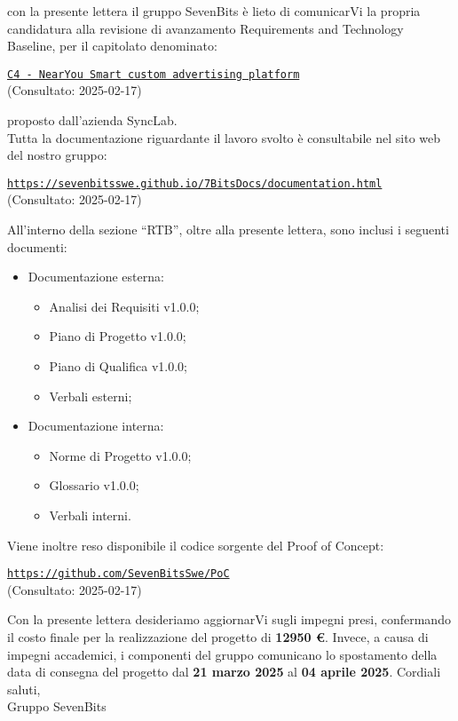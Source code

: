 \documentclass[10pt]{article}
\begin{document}
con la presente lettera il gruppo SevenBits è lieto di comunicarVi la propria candidatura alla revisione di avanzamento Requirements and Technology Baseline, per il capitolato denominato:
\begin{center}
\textcolor{blue}{\texttt{\href{https://www.math.unipd.it/~tullio/IS-1/2024/Progetto/C4.pdf}{C4 - NearYou Smart custom advertising platform}}}\\ (Consultato: 2025-02-17)
\end{center}
proposto dall'azienda SyncLab.\\
Tutta la documentazione riguardante il lavoro svolto è consultabile nel sito web del nostro gruppo:
\begin{center}
\textcolor{blue}{\texttt{\url{https://sevenbitsswe.github.io/7BitsDocs/documentation.html}}}\\ (Consultato: 2025-02-17)
\end{center}
All'interno della sezione ``RTB'', oltre alla presente lettera, sono inclusi i seguenti documenti:
\begin{itemize}
\item Documentazione esterna:
  \begin{itemize}
    \item Analisi dei Requisiti v1.0.0;
    \item Piano di Progetto v1.0.0;
    \item Piano di Qualifica v1.0.0;
    \item Verbali esterni;
  \end{itemize}
\item Documentazione interna:
  \begin{itemize}
    \item Norme di Progetto v1.0.0;
    \item Glossario v1.0.0;
    \item Verbali interni.
  \end{itemize}
\end{itemize}

Viene inoltre reso disponibile il codice sorgente del Proof of Concept:
\begin{center}
\textcolor{blue}{\texttt{\url{https://github.com/SevenBitsSwe/PoC}}}\\ (Consultato: 2025-02-17)
\end{center}
Con la presente lettera desideriamo aggiornarVi sugli impegni presi, confermando il costo finale per la realizzazione del progetto di \textbf{12950 €}. Invece, a causa di impegni accademici, i componenti del gruppo comunicano lo spostamento della data di consegna del progetto dal \textbf{21 marzo 2025} al \textbf{04 aprile 2025}.
\vspace{2mm}
\newline
Cordiali saluti,\\
Gruppo SevenBits
\end{document}
